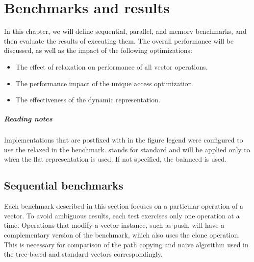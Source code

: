 \newcommand{\balanced}{}
\newcommand{\standard}{\rust{(s)}}
\newcommand{\relaxed}{\rust{(r)}}

\chapter{Benchmarks and results}
\label{chapter:benchmarks-and-results}

In this chapter, we will define sequential, parallel, and memory benchmarks, and then evaluate the results of executing them. The overall performance will be discussed, as well as the impact of the following optimizations:

\begin{itemize}
    \item The effect of \rrbtree{} relaxation on performance of all vector operations.
    \item The performance impact of the unique access optimization.
    \item The effectiveness of the dynamic representation.
\end{itemize}

\paragraph{Reading notes}
Implementations that are postfixed with \relaxed{} in the figure legend were configured to use the relaxed \treerrb{} in the benchmark. \standard{} stands for standard and will be applied only to \pvec{} when the flat representation is used. If not specified, the balanced \treerb{} is used.

\section{Sequential benchmarks}
Each benchmark described in this section focuses on a particular operation of a vector. To avoid ambiguous results, each test exercises only one operation at a time. Operations that modify a vector instance, such as push, will have a complementary version of the benchmark, which also uses the clone operation. This is necessary for comparison of the path copying and naive algorithm used in the tree-based and standard vectors correspondingly.

